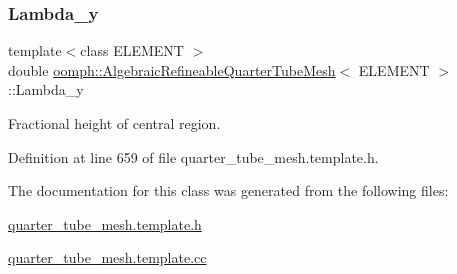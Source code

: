 \subsubsection{\texorpdfstring{Lambda\+\_\+y}{Lambda\_y}}
{\footnotesize\ttfamily template$<$class E\+L\+E\+M\+E\+NT $>$ \\
double \hyperlink{classoomph_1_1AlgebraicRefineableQuarterTubeMesh}{oomph\+::\+Algebraic\+Refineable\+Quarter\+Tube\+Mesh}$<$ E\+L\+E\+M\+E\+NT $>$\+::Lambda\+\_\+y\hspace{0.3cm}{\ttfamily [private]}}



Fractional height of central region. 



Definition at line 659 of file quarter\+\_\+tube\+\_\+mesh.\+template.\+h.



The documentation for this class was generated from the following files\+:\begin{DoxyCompactItemize}
\item 
\hyperlink{quarter__tube__mesh_8template_8h}{quarter\+\_\+tube\+\_\+mesh.\+template.\+h}\item 
\hyperlink{quarter__tube__mesh_8template_8cc}{quarter\+\_\+tube\+\_\+mesh.\+template.\+cc}\end{DoxyCompactItemize}
